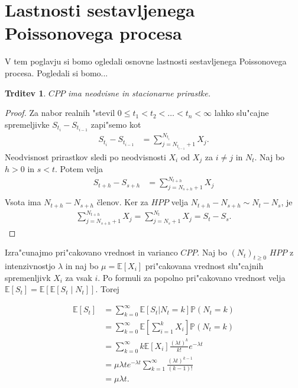 \documentclass[12pt, a4paper, reqno]{amsart}
\theoremstyle{definition} %
\theoremstyle{plain} %
\newtheorem{trditev}[definicija]{Trditev}
\newcommand{\E}{\mathbb{E}}
\newcommand{\Prob}{\mathbb{P}}
\newcommand{\1}{\mathds{1}}
\begin{document}
\section{Lastnosti sestavljenega Poissonovega procesa}

    V tem poglavju si bomo ogledali osnovne lastnosti sestavljenega Poissonovega procesa. Pogledali
    si bomo... 
    \begin{trditev}
        $CPP$ ima neodvisne in stacionarne prirastke.
        \label{trd:neodvPrirCPP}
    \end{trditev}

    \begin{proof}
        Za nabor realnih "stevil $0 \leq t_1 < t_2 < \ldots < t_n < \infty$ lahko slu"cajne
        spremeljivke $S_{t_i} - S_{t_{i-1}}$ zapi"semo kot
        \begin{align*}
            S_{t_i} - S_{t_{i-1}} &= \sum_{j=N_{t_{i-1}}+1}^{N_{t_i}} X_j. 
        \end{align*}
        Neodvisnost prirastkov sledi po neodvisnosti $X_i$ od $X_j$ za $i\neq j$ in $N_t$. 
        Naj bo $h > 0$ in $s < t$. Potem velja
        \begin{align*}
            S_{t+h} - S_{s+h} &= \sum_{j=N_{s+h}+1}^{N_{t+h}} X_j \\
        \end{align*}
        Vsota ima $N_{t+h} - N_{s+h}$ členov. Ker za $HPP$ velja 
        $N_{t+h} - N_{s+h} \sim N_t - N_s$, je 
        \begin{align*}
            \sum_{j=N_{s+h}+1}^{N_{t+h}} X_j = \sum_{j=N_{s}+1}^{N_{t}} X_j = S_t - S_s.
        \end{align*}
    \end{proof}

    Izra"cunajmo pri"cakovano vrednost in varianco $CPP$. Naj bo $(N_t)_{t\geq 0}$ $HPP$ z 
    intenzivnostjo $\lambda$ in naj bo $\mu = \E\left[X_i\right]$ pri"cakovana vrednost 
    slu"cajnih spremenljivk $X_i$ za vsak $i$. Po formuli za popolno pri"cakovano vrednost velja 
    $\E\left[S_t\right] = \E\left[\E\left[S_t\mid N_t\right]\right]$. Torej

    \begin{align*}
        \E\left[S_t\right] &= \sum_{k=0}^{\infty} \E\left[S_t | N_t = k\right] \Prob\left(N_t = k\right)\\
                           &= \sum_{k=0}^{\infty} \E\left[\sum_{i=1}^{k} X_i\right] \Prob\left(N_t = k\right)\\
                           &= \sum_{k=0}^{\infty}k\E\left[X_i\right]\frac{(\lambda t)^k}{k!}e^{-\lambda t}\\
                           &= \mu\lambda te^{-\lambda t}\sum_{k=1}^{\infty}\frac{(\lambda t)^{k-1}}{(k-1)!}\\
                           &= \mu\lambda t.
    \end{align*}
\end{document}
